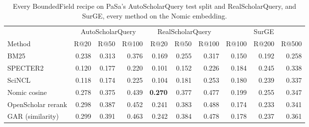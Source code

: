 \begin{table}[H]
\caption{Every BoundedField recipe on PaSa's AutoScholarQuery test split and RealScholarQuery, and SurGE, every method on the Nomic embedding.}
\label{tab:recipes-existing}
\centering
\small
\setlength{\tabcolsep}{4pt}
\begin{tabular}{lrrrrrrrrr}
\toprule
 & \multicolumn{3}{c}{AutoScholarQuery} & \multicolumn{3}{c}{RealScholarQuery} & \multicolumn{3}{c}{SurGE} \\
\cmidrule(lr){2-4}\cmidrule(lr){5-7}\cmidrule(lr){8-10}
Method & R@20 & R@50 & R@100 & R@20 & R@50 & R@100 & R@100 & R@200 & R@500 \\
\midrule
BM25 & 0.238 & 0.313 & 0.376 & 0.169 & 0.255 & 0.317 & 0.150 & 0.192 & 0.258 \\
SPECTER2 & 0.120 & 0.177 & 0.220 & 0.101 & 0.152 & 0.226 & 0.184 & 0.245 & 0.338 \\
SciNCL & 0.118 & 0.174 & 0.225 & 0.104 & 0.181 & 0.253 & 0.180 & 0.239 & 0.337 \\
Nomic cosine & 0.278 & 0.375 & 0.439 & \textbf{0.270} & 0.377 & 0.477 & 0.199 & 0.255 & 0.347 \\
OpenScholar rerank & 0.298 & 0.387 & 0.452 & 0.241 & 0.383 & 0.488 & 0.174 & 0.233 & 0.341 \\
GAR (similarity) & 0.299 & 0.391 & 0.463 & 0.242 & 0.384 & 0.478 & 0.178 & 0.237 & 0.361 \\

\end{tabular}
\end{table}
